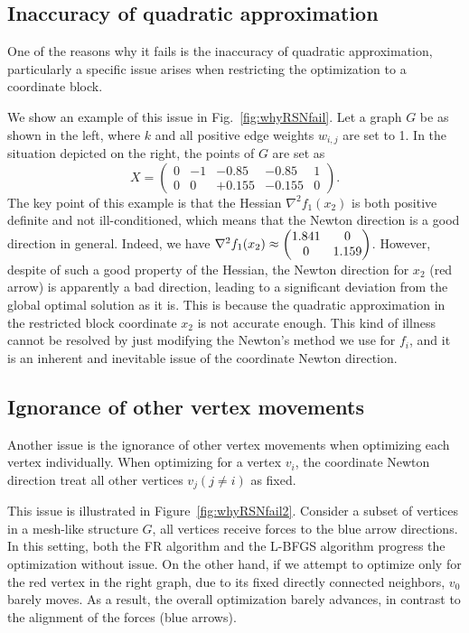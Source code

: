 \documentclass[dvipdfmx,10pt,journal,compsoc]{IEEEtran}
\begin{document}
\subsection{Inaccuracy of quadratic approximation}\label{ssec:inaccuracy}

One of the reasons why it fails is the inaccuracy of quadratic approximation, particularly a specific issue arises when restricting the optimization to a coordinate block.

We show an example of this issue in Fig.~\ref{fig:whyRSNfail}.
Let a graph $G$ be as shown in the left, where $k$ and all positive edge weights $w_{i,j}$ are set to 1.
In the situation depicted on the right, the points of $G$ are set as
\begin{equation*}
  X = \begin{pmatrix}
    0 & -1 & -0.85  & -0.85  & 1 \\
    0 & 0  & +0.155 & -0.155 & 0
  \end{pmatrix}.
\end{equation*}
The key point of this example is that the Hessian $\nabla^2 f_1(x_2)$ is both positive definite and not ill-conditioned, which means that the Newton direction is a good direction in general. Indeed, we have $\nabla^2 f_1(x_2) \approx \mqty(1.841&0\\0&1.159)$.
However, despite of such a good property of the Hessian, the Newton direction for $x_2$ (red arrow) is apparently a bad direction, leading to a significant deviation from the global optimal solution as it is. This is because the quadratic approximation in the restricted block coordinate $x_2$ is not accurate enough.
This kind of illness cannot be resolved by just modifying the Newton's method we use for $f_i$, and it is an inherent and inevitable issue of the coordinate Newton direction.

\subsection{Ignorance of other vertex movements}\label{ssec:ignorance}

Another issue is the ignorance of other vertex movements when optimizing each vertex individually.
When optimizing for a vertex $v_i$, the coordinate Newton direction treat all other vertices $v_j (j \neq i)$ as fixed.

This issue is illustrated in Figure~\ref{fig:whyRSNfail2}.
Consider a subset of vertices in a mesh-like structure $G$, all vertices receive forces to the blue arrow directions.
In this setting, both the FR algorithm and the L-BFGS algorithm progress the optimization without issue.
On the other hand, if we attempt to optimize only for the red vertex in the right graph, due to its fixed directly connected neighbors, $v_0$ barely moves.
As a result, the overall optimization barely advances, in contrast to the alignment of the forces (blue arrows).
\end{document}
